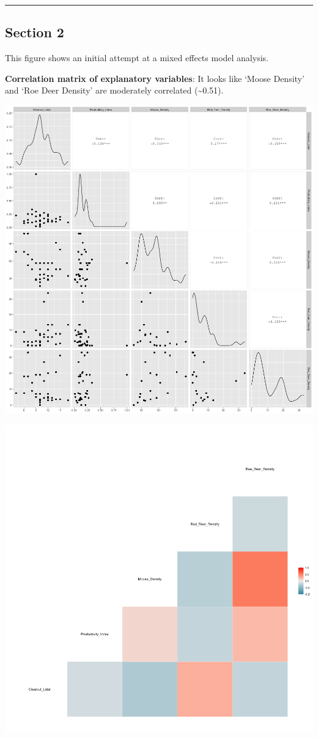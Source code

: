 \documentclass[]{article}
\begin{document}
\begin{center}\rule{0.5\linewidth}{0.5pt}\end{center}

\pagebreak

\subsection{Section 2}\label{section-2}

This figure shows an initial attempt at a mixed effects model analysis.

\textbf{Correlation matrix of explanatory variables}: It looks like
`Moose Density' and `Roe Deer Density' are moderately correlated
(\textasciitilde{}0.51).

\begin{center}\includegraphics[width=0.8\linewidth]{../../../Approach_3/Output/Analysis/corr_matrix_approach_3} \end{center}

\begin{center}\includegraphics[width=0.8\linewidth]{../../../Approach_3/Output/Analysis/corr_heatmap_approach_3} \end{center}
\end{document}
